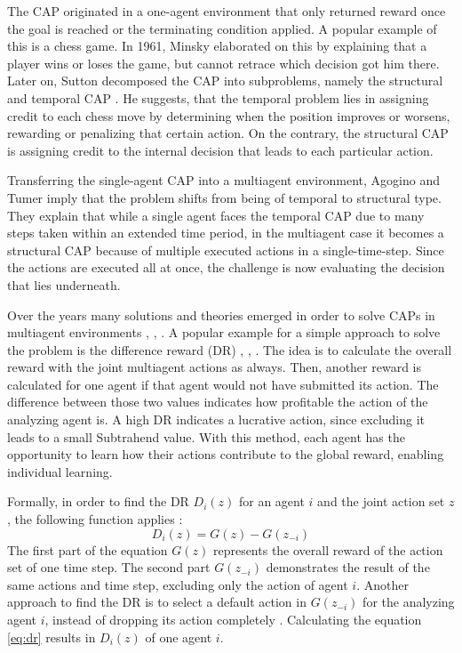 The CAP originated in a one-agent environment that only returned reward once the goal is reached or the terminating condition applied. A popular example of this is a chess game. In 1961, Minsky \cite{mi61} elaborated on this by explaining that a player wins or loses the game, but cannot retrace which decision got him there. Later on, Sutton decomposed the CAP into subproblems, namely the structural and temporal CAP \cite{su84}. He suggests, that the temporal problem lies in assigning credit to each chess move by determining when the position improves or worsens, rewarding or penalizing that certain action. On the contrary, the structural CAP is assigning credit to the internal decision that leads to each particular action.

Transferring the single-agent CAP into a multiagent environment, Agogino and Tumer \cite{agtu04} imply that the problem shifts from being of temporal to structural type. They explain that while a single agent faces the temporal CAP due to many steps taken within an extended time period, in the multiagent case it becomes a structural CAP because of multiple executed actions in a single-time-step. Since the actions are executed all at once, the challenge is now evaluating the decision that lies underneath.

Over the years many solutions and theories emerged in order to solve CAPs in multiagent environments \cite{rabe09}, \cite{zhli20}, \cite{agtu04}. A popular example for a simple approach to solve the problem is the difference reward (DR) \cite{ngku18}, \cite{yltu14}, \cite{agtu04}. The idea is to calculate the overall reward with the joint multiagent actions as always. Then, another reward is calculated for one agent if that agent would not have submitted its action. The difference between those two values indicates how profitable the action of the analyzing agent is. A high DR indicates a lucrative action, since excluding it leads to a small Subtrahend value. With this method, each agent has the opportunity to learn how their actions contribute to the global reward, enabling individual learning. 

Formally, in order to find the DR $D_i(z)$ for an agent $i$ and the joint action set $z$, the following function applies \cite{agtu04}:
\begin{equation}\label{eq:dr}
    D_i(z) = G(z) - G(z_{-i})
\end{equation}
The first part of the equation $G(z)$ represents the overall reward of the action set of one time step. The second part $G(z_{-i})$ demonstrates the result of the same actions and time step, excluding only the action of agent $i$. Another approach to find the DR is to select a default action in $G(z_{-i})$ for the analyzing agent $i$, instead of dropping its action completely \cite{vega96}. Calculating the equation \eqref{eq:dr} results in $D_i(z)$ of one agent $i$. 

